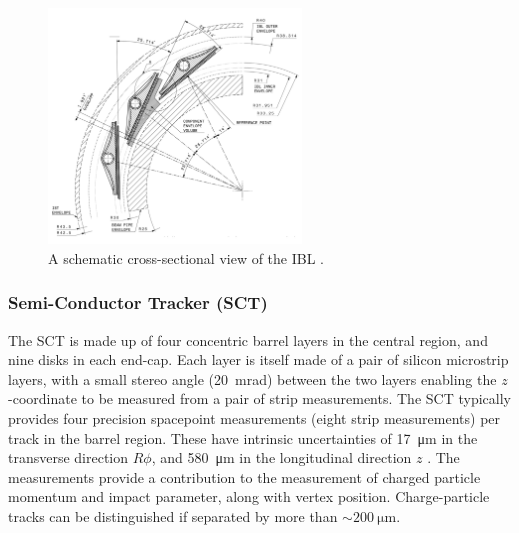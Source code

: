 \begin{figure}[!htpb]
  \centering
  \includegraphics[width=0.6\textwidth]{chapters/2.detector/figs/atlas_ibl.png}
  \caption{A schematic cross-sectional view of the \ATLAS IBL \cite{ATLAS-TDR-19}.}
  \label{fig:atlas_ibl}
\end{figure}

\subsubsection{Semi-Conductor Tracker (SCT)}
The SCT is made up of four concentric barrel layers in the central region, and nine disks in each end-cap.
Each layer is itself made of a pair of silicon microstrip layers, with a small stereo angle (\SI{20}{\milli\radian}) between the two layers enabling the $z$\nobreakdash-coordinate to be measured from a pair of strip measurements.
The SCT typically provides four precision spacepoint measurements (eight strip measurements) per track in the barrel region.
These have intrinsic uncertainties of \SI{17}{\micro\meter} in the transverse direction $R\phi$, and \SI{580}{\micro\meter} in the longitudinal direction $z$ \cite{IDET-2013-01}.
The measurements provide a contribution to the measurement of charged particle momentum and impact parameter, along with vertex position.
Charge-particle tracks can be distinguished if separated by more than $\sim \SI{200}{\micro\meter}$.


